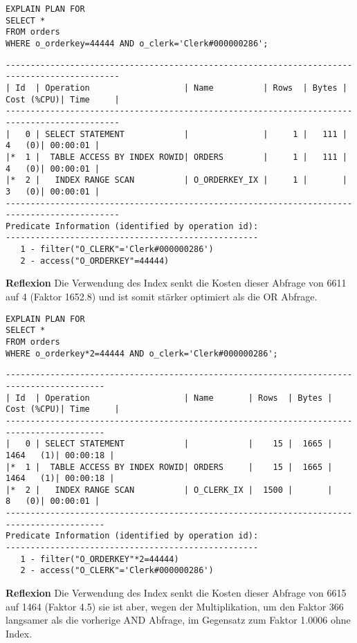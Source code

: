 \documentclass[10pt]{article}
\begin{document}
\begin{lstlisting}[style=sql]
EXPLAIN PLAN FOR
SELECT *
FROM orders
WHERE o_orderkey=44444 AND o_clerk='Clerk#000000286';
\end{lstlisting}
\begin{lstlisting}[style=queryexecutionplan]
---------------------------------------------------------------------------------------------
| Id  | Operation                   | Name          | Rows  | Bytes | Cost (%CPU)| Time     |
---------------------------------------------------------------------------------------------
|   0 | SELECT STATEMENT            |               |     1 |   111 |     4   (0)| 00:00:01 |
|*  1 |  TABLE ACCESS BY INDEX ROWID| ORDERS        |     1 |   111 |     4   (0)| 00:00:01 |
|*  2 |   INDEX RANGE SCAN          | O_ORDERKEY_IX |     1 |       |     3   (0)| 00:00:01 |
---------------------------------------------------------------------------------------------
Predicate Information (identified by operation id):
---------------------------------------------------
   1 - filter("O_CLERK"='Clerk#000000286')
   2 - access("O_ORDERKEY"=44444)
\end{lstlisting}
\textbf{Reflexion} \newline
Die Verwendung des Index senkt die Kosten dieser Abfrage von 6611 auf 4 (Faktor 1652.8) und ist somit stärker optimiert als die OR Abfrage.

\begin{lstlisting}[style=sql]
EXPLAIN PLAN FOR
SELECT *
FROM orders
WHERE o_orderkey*2=44444 AND o_clerk='Clerk#000000286';
\end{lstlisting}
\begin{lstlisting}[style=queryexecutionplan]
------------------------------------------------------------------------------------------
| Id  | Operation                   | Name       | Rows  | Bytes | Cost (%CPU)| Time     |
------------------------------------------------------------------------------------------
|   0 | SELECT STATEMENT            |            |    15 |  1665 |  1464   (1)| 00:00:18 |
|*  1 |  TABLE ACCESS BY INDEX ROWID| ORDERS     |    15 |  1665 |  1464   (1)| 00:00:18 |
|*  2 |   INDEX RANGE SCAN          | O_CLERK_IX |  1500 |       |     8   (0)| 00:00:01 |
------------------------------------------------------------------------------------------
Predicate Information (identified by operation id):
---------------------------------------------------
   1 - filter("O_ORDERKEY"*2=44444)
   2 - access("O_CLERK"='Clerk#000000286')
\end{lstlisting}
\textbf{Reflexion} \newline
Die Verwendung des Index senkt die Kosten dieser Abfrage von 6615 auf 1464 (Faktor 4.5) sie ist aber, wegen der Multiplikation, um den Faktor 366 langsamer als die vorherige AND Abfrage, im Gegensatz zum Faktor 1.0006 ohne Index.
\end{document}
